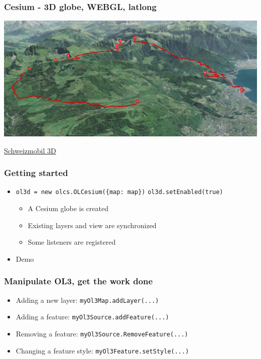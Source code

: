 \documentclass{beamer}
\begin{document}
  \begin{frame}
    \frametitle{Cesium - 3D globe, WEBGL, latlong}
		\begin{center}
		  \includegraphics[width=1.0 \linewidth]{./vtt_3d2.png}
		\end{center}
    \href{https://map.schweizmobil.ch/?cesium&trackId=2149217}{Schweizmobil 3D}
  \end{frame}



  \begin{frame}
    \frametitle{Getting started}

    \begin{itemize}
      \item
        \small{\texttt{ol3d = new olcs.OLCesium(\{map: map\})}}
        \small{\texttt{ol3d.setEnabled(true)}}
        \pause
      \begin{itemize}
        \item A Cesium globe is created
          \pause
        \item Existing layers and view are synchronized
         \pause
        \item Some listeners are registered
          \pause
      \end{itemize}
      \item Demo
    \end{itemize}
  \end{frame}


  \begin{frame}
    \frametitle{Manipulate OL3, get the work done}
    \begin{itemize}
      \item Adding a new layer: \small{\texttt{myOl3Map.addLayer(...)}}
        \pause
      \item Adding a feature: \small{\texttt{myOl3Source.addFeature(...)}}
        \pause
      \item Removing a feature: \small{\texttt{myOl3Source.RemoveFeature(...)}}
        \pause
      \item Changing a feature style: \small{\texttt{myOl3Feature.setStyle(...)}}
    \end{itemize}
  \end{frame}
\end{document}
